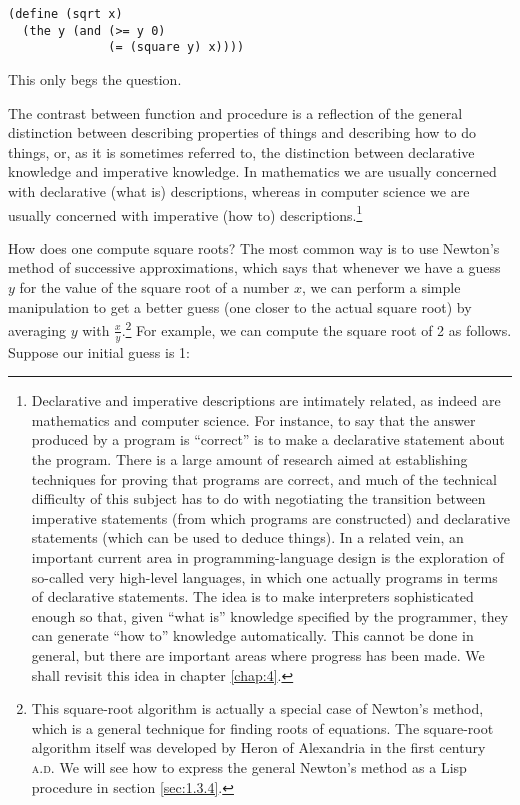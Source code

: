 \begin{verbatim}
(define (sqrt x)
  (the y (and (>= y 0)
              (= (square y) x))))
\end{verbatim}

This only begs the question.

The contrast between function and procedure is a reflection of the
general distinction between describing properties of things and
describing how to do things, or, as it is sometimes referred to, the
distinction between declarative knowledge and imperative knowledge.
In mathematics we are usually concerned with declarative (what is)
descriptions, whereas in computer science we are usually concerned
with imperative (how to) descriptions.\footnote{ Declarative and
  imperative descriptions are intimately related, as indeed are
  mathematics and computer science.  For instance, to say that the
  answer produced by a program is ``correct'' is to make a declarative
  statement about the program.  There is a large amount of research
  aimed at establishing techniques for proving that programs are
  correct, and much of the technical difficulty of this subject has to
  do with negotiating the transition between imperative statements
  (from which programs are constructed) and declarative statements
  (which can be used to deduce things).  In a related vein, an
  important current area in programming-language design is the
  exploration of so-called very high-level languages, in which one
  actually programs in terms of declarative statements.  The idea is
  to make interpreters sophisticated enough so that, given ``what is''
  knowledge specified by the programmer, they can generate ``how to''
  knowledge automatically.  This cannot be done in general, but there
  are important areas where progress has been made.  We shall revisit
  this idea in chapter \ref{chap:4}.}


How does one compute square roots?  The most common way is to use
Newton's method of successive approximations, which says that whenever
we have a guess $y$ for the value of the square root of a number $x$,
we can perform a simple manipulation to get a better guess (one closer
to the actual square root) by averaging $y$ with
$\frac{x}{y}$.\footnote{This square-root algorithm is actually a
  special case of Newton's method, which is a general technique for
  finding roots of equations.  The square-root algorithm itself was
  developed by Heron of Alexandria in the first century \textsc{a.d}.
  We will see how to express the general Newton's method as a Lisp
  procedure in section \ref{sec:1.3.4}.}  For example, we can compute
the square root of 2 as follows.  Suppose our initial guess is 1:

